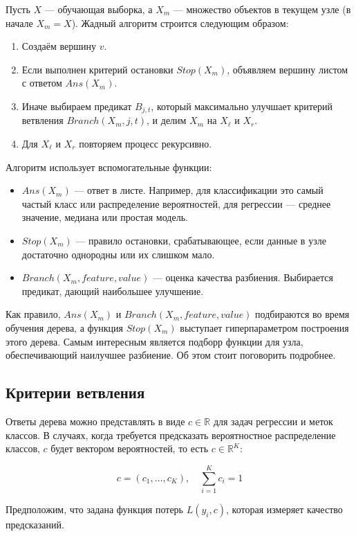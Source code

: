\begin{itemize}
Пусть $X$ — обучающая выборка, а $X_m$ — множество объектов в текущем узле (в начале $X_m = X$). Жадный алгоритм строится следующим образом:

\begin{enumerate}
    \item Создаём вершину $v$.
    \item Если выполнен критерий остановки $Stop(X_m)$, объявляем вершину листом с ответом $Ans(X_m)$.
    \item Иначе выбираем предикат $B_{j,t}$, который максимально улучшает критерий ветвления $Branch(X_m, j, t)$, и делим $X_m$ на $X_{\ell}$ и $X_r$.
    \item Для $X_{\ell}$ и $X_r$ повторяем процесс рекурсивно.
\end{enumerate}

Алгоритм использует вспомогательные функции:
\begin{itemize}
    \item $Ans(X_m)$ — ответ в листе. Например, для классификации это самый частый класс или распределение вероятностей, для регрессии — среднее значение, медиана или простая модель.
    \item $Stop(X_m)$ — правило остановки, срабатывающее, если данные в узле достаточно однородны или их слишком мало.
    \item $Branch(X_m, \textit{feature}, \textit{value})$ — оценка качества разбиения. Выбирается предикат, дающий наибольшее улучшение.
\end{itemize}

Как правило, $Ans(X_m)$ и $Branch(X_m, \textit{feature}, \textit{value})$ подбираются во время обучения дерева, а функция $Stop(X_m)$ выступает гиперпараметром построения этого дерева.
Самым интересным является подборр функции для узла, обеспечивающий наилучшее разбиение. Об этом стоит поговорить подробнее.

\subsection{Критерии ветвления}
Ответы дерева можно представлять в виде $c \in \mathbb{R}$ для задач регрессии и меток классов. В случаях, когда требуется предсказать вероятностное распределение классов, $c$ будет вектором вероятностей, то есть $c \in \mathbb{R}^K$:

\[
c = (c_1, \dots, c_K), \quad \sum_{i=1}^K c_i = 1
\]

Предположим, что задана функция потерь $L(y_i, c)$, которая измеряет качество предсказаний.


\end{itemize}

